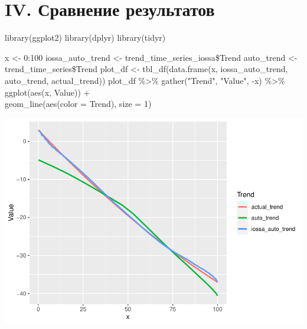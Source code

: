 \documentclass[specialist,
               substylefile = spbu_report.rtx,
               subf,href,colorlinks=true, 12pt]{disser}
\theoremstyle{definition}
\newenvironment{Shaded}{\begin{snugshade}}{\end{snugshade}}
\newcommand{\AttributeTok}[1]{\textcolor[rgb]{0.77,0.63,0.00}{#1}}
\newcommand{\DecValTok}[1]{\textcolor[rgb]{0.00,0.00,0.81}{#1}}
\newcommand{\FunctionTok}[1]{\textcolor[rgb]{0.00,0.00,0.00}{#1}}
\newcommand{\NormalTok}[1]{#1}
\newcommand{\OtherTok}[1]{\textcolor[rgb]{0.56,0.35,0.01}{#1}}
\newcommand{\SpecialCharTok}[1]{\textcolor[rgb]{0.00,0.00,0.00}{#1}}
\newcommand{\StringTok}[1]{\textcolor[rgb]{0.31,0.60,0.02}{#1}}
\begin{document}
\hypertarget{iv.-ux441ux440ux430ux432ux43dux435ux43dux438ux435-ux440ux435ux437ux443ux43bux44cux442ux430ux442ux43eux432}{%
\section{IV. Сравнение
результатов}\label{iv.-ux441ux440ux430ux432ux43dux435ux43dux438ux435-ux440ux435ux437ux443ux43bux44cux442ux430ux442ux43eux432}}

\begin{Shaded}
\begin{Highlighting}[]
  \FunctionTok{library}\NormalTok{(ggplot2)}
  \FunctionTok{library}\NormalTok{(dplyr)}
  \FunctionTok{library}\NormalTok{(tidyr)}
  
\NormalTok{  x }\OtherTok{\textless{}{-}} \DecValTok{0}\SpecialCharTok{:}\DecValTok{100}
\NormalTok{  iossa\_auto\_trend }\OtherTok{\textless{}{-}}\NormalTok{ trend\_time\_series\_iossa}\SpecialCharTok{\$}\NormalTok{Trend}
\NormalTok{  auto\_trend }\OtherTok{\textless{}{-}}\NormalTok{ trend\_time\_series}\SpecialCharTok{\$}\NormalTok{Trend}
\NormalTok{  plot\_df }\OtherTok{\textless{}{-}} \FunctionTok{tbl\_df}\NormalTok{(}\FunctionTok{data.frame}\NormalTok{(x, iossa\_auto\_trend, auto\_trend, actual\_trend))}
\NormalTok{  plot\_df }\SpecialCharTok{\%\textgreater{}\%} \FunctionTok{gather}\NormalTok{(}\StringTok{"Trend"}\NormalTok{, }\StringTok{"Value"}\NormalTok{, }\SpecialCharTok{{-}}\NormalTok{x) }\SpecialCharTok{\%\textgreater{}\%} \FunctionTok{ggplot}\NormalTok{(}\FunctionTok{aes}\NormalTok{(x, Value)) }\SpecialCharTok{+} 
\\ \FunctionTok{geom\_line}\NormalTok{(}\FunctionTok{aes}\NormalTok{(}\AttributeTok{color =}\NormalTok{ Trend), }\AttributeTok{size =} \DecValTok{1}\NormalTok{)}
\end{Highlighting}
\end{Shaded}

\includegraphics{iossa_example2/comparing-1.pdf}
\end{document}
